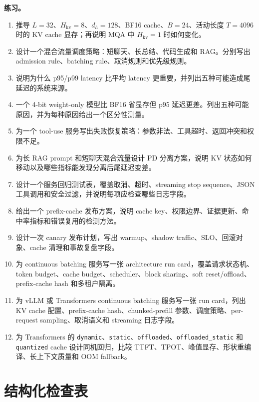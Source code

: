 \documentclass[UTF8,zihao=-4,openany]{ctexbook}
\begin{document}
\textbf{练习。}
\begin{enumerate}
\item 推导 $L=32$、$H_{\mathrm{kv}}=8$、$d_h=128$、BF16 cache、$B=24$、活动长度 $T=4096$ 时的 KV cache 显存；再说明 MQA 中 $H_{\mathrm{kv}}=1$ 时如何变化。
\item 设计一个混合流量调度策略：短聊天、长总结、代码生成和 RAG。分别写出 admission rule、batching rule、取消规则和优先级规则。
\item 说明为什么 p95/p99 latency 比平均 latency 更重要，并列出五种可能造成尾延迟的系统来源。
\item 一个 4-bit weight-only 模型比 BF16 省显存但 p95 延迟更差。列出五种可能原因，并为每种原因给出一个区分性测量。
\item 为一个 tool-use 服务写出失败恢复策略：参数非法、工具超时、返回冲突和权限不足。
\item 为长 RAG prompt 和短聊天混合流量设计 PD 分离方案，说明 KV 状态如何移动以及哪些指标能发现分离后尾延迟变差。
\item 设计一个服务回归测试表，覆盖取消、超时、streaming stop sequence、JSON 工具调用和安全过滤，并说明每项应检查哪些日志字段。
\item 给出一个 prefix-cache 发布方案，说明 cache key、权限边界、证据更新、命中率指标和错误复用的检测方法。
\item 设计一次 canary 发布计划，写出 warmup、shadow traffic、SLO、回滚对象、cache 清理和事故复盘字段。
\item 为 continuous batching 服务写一张 architecture run card，覆盖请求状态机、token budget、cache budget、scheduler、block sharing、soft reset/offload、prefix-cache hash 和多租户隔离。
\item 为 vLLM 或 Transformers continuous batching 服务写一张 run card，列出 KV cache 配置、prefix-cache hash、chunked-prefill 参数、调度策略、per-request sampling、取消语义和 streaming 日志字段。
\item 为 Transformers 的 \texttt{dynamic}、\texttt{static}、\texttt{offloaded}、\texttt{offloaded\_static} 和 \texttt{quantized} cache 设计同机回归，比较 TTFT、TPOT、峰值显存、形状重编译、长上下文质量和 OOM fallback。
\end{enumerate}

\section{结构化检查表}
\end{document}
